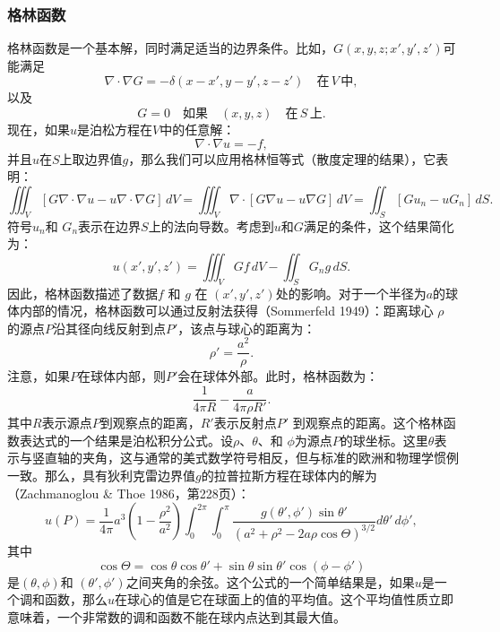 \subsubsection{格林函数}  
格林函数是一个基本解，同时满足适当的边界条件。比如，\( G(x,y,z;x',y',z') \)可能满足  
\[
\nabla \cdot \nabla G = -\delta (x - x', y - y', z - z') \quad \text{在} \, V \, \text{中},~
\]
以及  
\[
G = 0 \quad \text{如果} \quad (x, y, z) \quad \text{在} \, S \, \text{上}.~
\]
现在，如果\( u \)是泊松方程在\( V \)中的任意解：
\[
\nabla \cdot \nabla u = -f,~
\]
并且\( u \)在\( S \)上取边界值\( g \)，那么我们可以应用格林恒等式（散度定理的结果），它表明：
\[
\iiint_V \left[ G \nabla \cdot \nabla u - u \nabla \cdot \nabla G \right] \, dV = \iiint_V \nabla \cdot \left[ G \nabla u - u \nabla G \right] \, dV = \iint_S \left[ G u_n - u G_n \right] \, dS.~
\]
符号\( u_n \)和 \( G_n \)表示在边界\( S \)上的法向导数。考虑到\( u \)和\( G \)满足的条件，这个结果简化为：
\[
u(x',y',z') = \iiint_V Gf \, dV - \iint_S G_n g \, dS.~
\]
因此，格林函数描述了数据\( f \) 和 \( g \) 在 \( (x', y', z') \)处的影响。对于一个半径为\( a \)的球体内部的情况，格林函数可以通过反射法获得（Sommerfeld 1949）：距离球心 \( \rho \) 的源点\( P \)沿其径向线反射到点\( P' \)，该点与球心的距离为：
\[
\rho' = \frac{a^2}{\rho}.~
\]
注意，如果\( P \)在球体内部，则\( P' \)会在球体外部。此时，格林函数为：
\[
\frac{1}{4\pi R} - \frac{a}{4\pi \rho R'}.~
\]
其中\( R \)表示源点\( P \)到观察点的距离，\( R' \)表示反射点\( P' \) 到观察点的距离。这个格林函数表达式的一个结果是泊松积分公式。设\( \rho \)、\( \theta \)、和 \( \phi \)为源点\( P \)的球坐标。这里\( \theta \)表示与竖直轴的夹角，这与通常的美式数学符号相反，但与标准的欧洲和物理学惯例一致。那么，具有狄利克雷边界值\( g \)的拉普拉斯方程在球体内的解为（Zachmanoglou & Thoe 1986，第228页）：
\[
u(P) = \frac{1}{4\pi} a^3 \left( 1 - \frac{\rho^2}{a^2} \right) \int_0^{2\pi} \int_0^\pi \frac{g(\theta', \phi') \sin \theta'}{\left( a^2 + \rho^2 - 2a \rho \cos \Theta \right)^{3/2}} d\theta' \, d\phi',~
\]
其中  
\[
\cos \Theta = \cos \theta \cos \theta' + \sin \theta \sin \theta' \cos(\phi - \phi')~
\]  
是\( (\theta, \phi) \)和 \( (\theta', \phi') \)之间夹角的余弦。这个公式的一个简单结果是，如果\( u \)是一个调和函数，那么\( u \)在球心的值是它在球面上的值的平均值。这个平均值性质立即意味着，一个非常数的调和函数不能在球内点达到其最大值。
